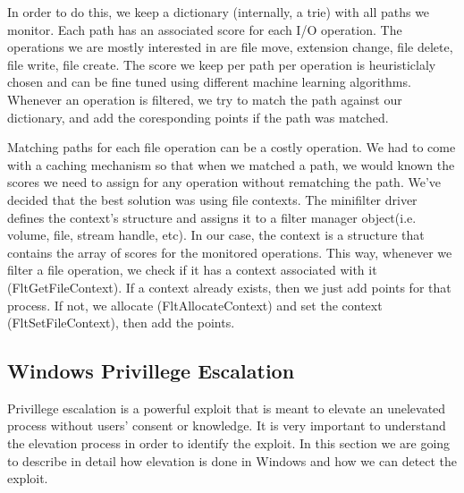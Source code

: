 \documentclass[conference]{IEEEtran}
\begin{document}
    \par{}
    In order to do this, we keep a dictionary (internally, a trie) with all paths we monitor. Each path has an associated score for each I/O
    operation. The operations we are mostly interested in are file move, extension change, file delete, file write, file create. The score we
    keep per path per operation is heuristiclaly chosen and can be fine tuned using different machine learning algorithms. Whenever an operation
    is filtered, we try to match the path against our dictionary, and add the coresponding points if the path was matched.\\

    \par{}
    Matching paths for each file operation can be a costly operation. We had to come with a caching mechanism so that when we matched a path,
    we would known the scores we need to assign for any operation without rematching the path. We've decided that the best solution was using
    file contexts. The minifilter driver defines the context's structure and assigns it to a filter manager object(i.e. volume, file, stream handle,
    etc). In our case, the context is a structure that contains the array of scores for the monitored operations. This way, whenever we filter a
    file operation, we check if it has a context associated with it (FltGetFileContext). If a context already exists, then we just add points for that process. If not,
    we allocate (FltAllocateContext) and set the context (FltSetFileContext), then add the points.


    \subsection{Windows Privillege Escalation}
    Privillege escalation is a powerful exploit that is meant to elevate an unelevated process without users' consent or knowledge. It is very
    important to understand the elevation process in order to identify the exploit. In this section we are going to describe in detail how
    elevation is done in Windows and how we can detect the exploit.\\
\end{document}
